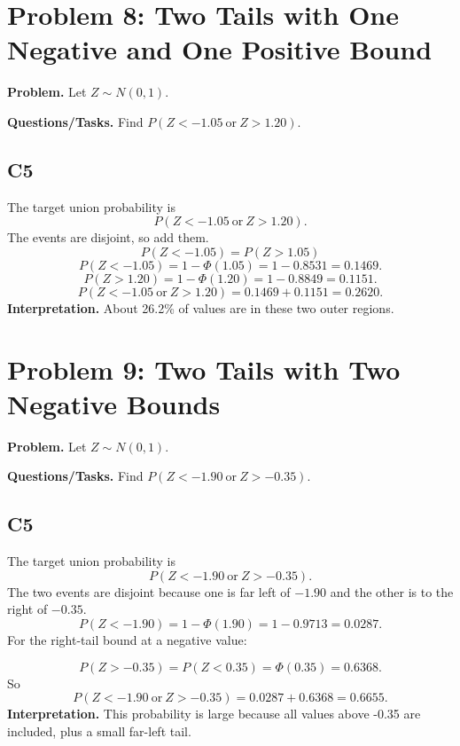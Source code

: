 \section{Problem 8: Two Tails with One Negative and One Positive Bound}
\textbf{Problem.} Let \(Z\sim N(0,1)\).

\textbf{Questions/Tasks.} Find \(P(Z<-1.05\ \text{or}\ Z>1.20)\).

\subsection*{C5}
The target union probability is
\[
P(Z<-1.05\ \text{or}\ Z>1.20).
\]
The events are disjoint, so add them.
\[
P(Z<-1.05)=P(Z>1.05)
\]
\[
P(Z<-1.05)=1-\Phi(1.05)=1-0.8531=0.1469.
\]
\[
P(Z>1.20)=1-\Phi(1.20)=1-0.8849=0.1151.
\]
\[
P(Z<-1.05\ \text{or}\ Z>1.20)=0.1469+0.1151=0.2620.
\]
\textbf{Interpretation.} About 26.2\% of values are in these two outer regions.

\section{Problem 9: Two Tails with Two Negative Bounds}
\textbf{Problem.} Let \(Z\sim N(0,1)\).

\textbf{Questions/Tasks.} Find \(P(Z<-1.90\ \text{or}\ Z>-0.35)\).

\subsection*{C5}
The target union probability is
\[
P(Z<-1.90\ \text{or}\ Z>-0.35).
\]
The two events are disjoint because one is far left of \(-1.90\) and the other is to the right of \(-0.35\).
\[
P(Z<-1.90)=1-\Phi(1.90)=1-0.9713=0.0287.
\]
For the right-tail bound at a negative value:

\begin{center}
\begin{minipage}{0.48\textwidth}
\centering
{}
\end{minipage}
\hfill
\begin{minipage}{0.48\textwidth}
\centering
{}
\end{minipage}
\end{center}

\[
P(Z>-0.35)=P(Z<0.35)=\Phi(0.35)=0.6368.
\]
So
\[
P(Z<-1.90\ \text{or}\ Z>-0.35)=0.0287+0.6368=0.6655.
\]
\textbf{Interpretation.} This probability is large because all values above -0.35 are included, plus a small far-left tail.


